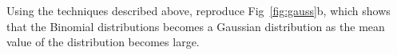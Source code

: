 \begin{plot} Using the techniques described above, reproduce Fig~\ref{fig:gauss}b, which shows that the Binomial distributions becomes a Gaussian distribution as the mean value of the distribution becomes large. \end{plot}
























